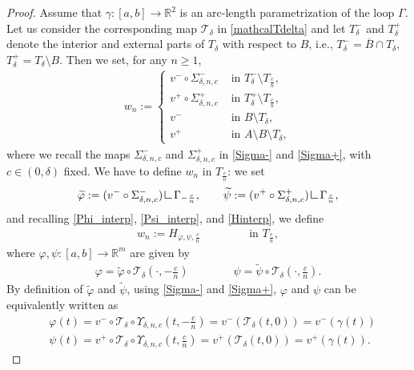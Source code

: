 \documentclass[a4paper,11pt]{article}
\numberwithin{equation}{section}
\newcommand{\R}{\mathbb{R}}
\newcommand{\res}      {\mathop{\hbox{\vrule height 7pt width .5pt depth
                        0pt\vrule height .5pt width 6pt depth 0pt}}\nolimits}
\begin{document}
\begin{proof}
	Assume  that  $\gamma:[a,b]\rightarrow \R^2$ is an arc-length parametrization of the loop $\Gamma$. Let us consider the corresponding map $\mathcal T_\delta$ in \eqref{mathcalTdelta} and let $T^-_\delta$ and $T^+_\delta$ denote the interior and external parts of $T_\delta$ with respect to $B$, i.e., $ T^-_\delta=\overline B\cap T_\delta$, $T^+_\delta=T_\delta\setminus B$. Then we set, for any $n\geq 1$,
	\begin{align}
		w_{n}:=\begin{cases}
			v^-\circ \Sigma_{\delta,n,c}^-&\text{ in }T^-_\delta\setminus T_{\frac cn},\\
			v^+\circ  \Sigma_{\delta,n,c}^+&\text{ in }T^+_\delta\setminus T_{\frac cn},\\
			v^-&\text{ in }B\setminus T_\delta,\\
			v^+&\text{ in }A\setminus B\setminus T_\delta,
		\end{cases}
	\end{align}
	where we recall the maps $\Sigma_{\delta,n,c}^-$ and $\Sigma_{\delta,n,c}^+$ in \eqref{Sigma-} and \eqref{Sigma+}, with $c\in (0,\delta)$ fixed.
	We have to define $w_{n}$ in $T_{\frac cn}$: we set 
	$$\widetilde\varphi:=(v^-\circ \Sigma_{\delta,n,c}^- )\res \Gamma_{-\frac cn},\qquad \widetilde\psi:=(v^+\circ \Sigma_{\delta,n,c}^+)\res \Gamma_{\frac cn},$$
	and 
	recalling \eqref{Phi_interp}, \eqref{Psi_interp}, and \eqref{Hinterp}, we define
	\begin{align}
		w_{n}:=H_{\varphi,\psi,\frac cn}\qquad \qquad \text{ in }T_{\frac cn},
	\end{align}
	where $\varphi,\psi:[a,b]\rightarrow \R^m$ are given by
	\begin{align}
		\varphi=\widetilde \varphi\circ \mathcal T_\delta (\cdot,-\frac cn) \qquad \qquad \psi=\widetilde \psi\circ \mathcal T_\delta (\cdot,\frac cn).
	\end{align}
	By definition of $\widetilde\varphi$ and $\widetilde\psi$, using \eqref{Sigma-} and \eqref{Sigma+}, $\varphi$ and $\psi$  can be equivalently written as 
	\begin{align*}
		&\varphi(t)=v^-\circ\mathcal T_\delta\circ \Upsilon_{\delta,n,c}(t,-\frac cn)=v^-(\mathcal T_\delta(t,0))=v^-(\gamma(t))\\
		&\psi(t)=v^+\circ\mathcal T_\delta\circ \Upsilon_{\delta,n,c}(t,\frac cn)=v^+(\mathcal T_\delta(t,0))=v^+(\gamma(t)).
	\end{align*}

\end{proof}
\end{document}
